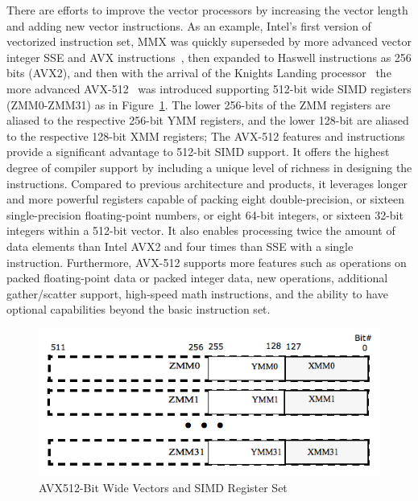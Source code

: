 \documentclass[5p,times,twocolumn]{elsarticle}
\begin{document}
There are efforts to improve the vector processors by increasing the vector
length and adding new vector instructions.
As an example, Intel's first version of vectorized instruction set, MMX was quickly superseded by more advanced vector integer SSE and AVX instructions~\cite{intelsse, intelavx, avxsets},
then expanded to Haswell instructions as 256 bits (AVX2),
and then with the arrival of the Knights Landing processor~\cite{avx-info} the more advanced
AVX-512~\cite{Intelref} was introduced supporting 512-bit wide SIMD registers (ZMM0-ZMM31)
as in Figure~\ref{fig:avxmms}. The lower 256-bits of the ZMM registers are
aliased to the respective 256-bit YMM registers, and the lower 128-bit are
aliased to the respective 128-bit XMM registers;
%
The AVX-512 features and instructions provide a significant advantage to 512-bit SIMD support.
It offers the highest degree of compiler support by including a unique level of richness
in designing the instructions.
%
Compared to previous architecture and products, it leverages longer and more
powerful registers capable of packing eight double-precision, or sixteen
single-precision floating-point numbers,
or eight 64-bit integers, or sixteen 32-bit integers within a 512-bit vector.
It also enables processing twice the amount of data elements than Intel AVX2 and four
times than SSE with a single instruction.
%
Furthermore,  AVX-512 supports more features such as operations on packed
floating-point data or packed integer data, new operations, additional
gather/scatter support, high-speed math instructions, and the ability to have
optional capabilities beyond the basic instruction set.

\begin{figure}[h]
    \centering
    \includegraphics[width=\linewidth]{avx_mms.png}
    \caption{AVX512-Bit Wide Vectors and SIMD Register Set}
    \label{fig:avxmms}
\end{figure}
\end{document}
